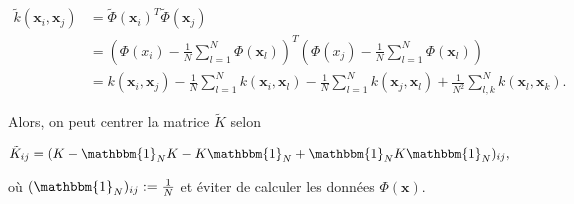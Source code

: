 \begin{align*}
\tilde{k}(\textbf{x}_i, \textbf{x}_j) &= \tilde{\Phi}(\textbf{x}_i)^T\tilde{\Phi}(\textbf{x}_j)\\
&= \left( \Phi(x_i) - \frac{1}{N}\sum_{l = 1}^{N}\Phi(\textbf{x}_l) \right)^T \left(\Phi(x_j) - \frac{1}{N}\sum_{l = 1}^{N}\Phi(\textbf{x}_l)\right)\\
&= k(\textbf{x}_i, \textbf{x}_j) - \frac{1}{N}\sum_{l = 1}^{N}k(\textbf{x}_i, \textbf{x}_l) - \frac{1}{N}\sum_{l = 1}^{N}k(\textbf{x}_j, \textbf{x}_l) + \frac{1}{N^2} \sum_{l, k}^{N}k(\textbf{x}_l, \textbf{x}_k).
\end{align*}

Alors, on peut centrer la matrice $\tilde{K}$ selon

\begin{equation*}
\tilde{K}_{ij} = (K - \mathbbm{1}_NK - K\mathbbm{1}_N + \mathbbm{1}_NK\mathbbm{1}_N)_{ij},
\end{equation*}

où $(\mathbbm{1}_N)_{ij} := \frac{1}{N}$ et éviter de calculer les données $\Phi(\textbf{x})$. 

